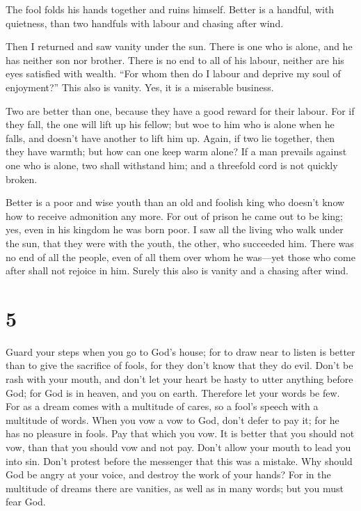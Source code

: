  The fool folds his hands together and ruins himself.
 Better is a handful, with quietness, than two handfuls with
labour and chasing after wind.

 Then I returned and saw vanity under the sun. 
There is one who is alone, and he has neither son nor brother. There is
no end to all of his labour, neither are his eyes satisfied with wealth.
``For whom then do I labour and deprive my soul of enjoyment?'' This
also is vanity. Yes, it is a miserable business.

 Two are better than one, because they have a good reward
for their labour.  For if they fall, the one will lift up
his fellow; but woe to him who is alone when he falls, and doesn't have
another to lift him up.  Again, if two lie together, then
they have warmth; but how can one keep warm alone?  If a
man prevails against one who is alone, two shall withstand him; and a
threefold cord is not quickly broken.

 Better is a poor and wise youth than an old and foolish
king who doesn't know how to receive admonition any more. 
For out of prison he came out to be king; yes, even in his kingdom he
was born poor.  I saw all the living who walk under the
sun, that they were with the youth, the other, who succeeded him.
 There was no end of all the people, even of all them over
whom he was---yet those who come after shall not rejoice in him. Surely
this also is vanity and a chasing after wind.

\hypertarget{section-4}{%
\section{5}\label{section-4}}

 Guard your steps when you go to God's house; for to draw
near to listen is better than to give the sacrifice of fools, for they
don't know that they do evil.  Don't be rash with your
mouth, and don't let your heart be hasty to utter anything before God;
for God is in heaven, and you on earth. Therefore let your words be few.
 For as a dream comes with a multitude of cares, so a fool's
speech with a multitude of words.  When you vow a vow to
God, don't defer to pay it; for he has no pleasure in fools. Pay that
which you vow.  It is better that you should not vow, than
that you should vow and not pay.  Don't allow your mouth to
lead you into sin. Don't protest before the messenger that this was a
mistake. Why should God be angry at your voice, and destroy the work of
your hands?  For in the multitude of dreams there are
vanities, as well as in many words; but you must fear God.

